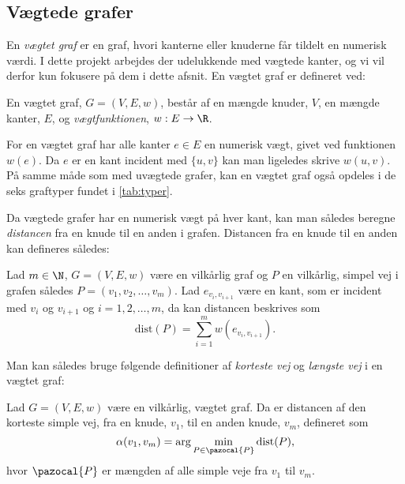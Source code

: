 \subsection{Vægtede grafer} \label{kap:vaegtede}
En \emph{vægtet graf} er en graf, hvori kanterne eller knuderne får tildelt en numerisk værdi. I dette projekt arbejdes der udelukkende med vægtede kanter, og vi vil derfor kun fokusere på dem i dette afsnit.
En vægtet graf er defineret ved:
\begin{defn}
En vægtet graf, $G=(V,E,w)$, består af en mængde knuder, $V$, en mængde kanter, $E$, og \emph{vægtfunktionen}, $w: E \rightarrow \R$.
\end{defn}

For en vægtet graf har alle kanter $e\in E$ en numerisk vægt, givet ved funktionen $w (e)$. Da $e$ er en kant incident med $\{u,v\}$ kan man ligeledes skrive $w (u,v)$. På samme måde som med uvægtede grafer, kan en vægtet graf også opdeles i de seks graftyper fundet i \autoref{tab:typer}.


Da vægtede grafer har en numerisk vægt på hver kant, kan man således beregne \emph{distancen} fra en knude til en anden i grafen. Distancen fra en knude til en anden kan defineres således:

\begin{defn}[Distance]
Lad $m\in \N $, $G=(V,E,w)$ være en vilkårlig graf og $P$ en vilkårlig, simpel vej i grafen således $P=(v_{1},v_{2},\dotsc,v_{m})$. Lad $e_{v_i,v_{i+1}}$ være en kant, som er incident med $v_i$ og $v_{i+1}$ og $i = 1, 2, \dotsc, m$, da kan distancen beskrives som
	\begin{equation}
	\mathrm{dist}(P)=\sum_{i=1}^{m}w(e_{v_i,v_{i+1}}).
	\end{equation}  
\end{defn}

Man kan således bruge følgende definitioner af \emph{korteste vej} og \emph{længste vej} i en vægtet graf:


\begin{defn} \label{defn:min.vej}
Lad $G=(V,E,w)$ være en vilkårlig, vægtet graf. Da er distancen af den korteste simple vej, fra en knude, $v_1$, til en anden knude, $v_m$, defineret som
	\begin{equation}
		\alpha(v_1,v_m)=\arg \min_{P \in \pazocal{P}}
		\textrm{dist}(P),
	\end{equation}
	hvor $\pazocal{P}$ er mængden af alle simple veje fra $v_1$ til $v_m$.
\end{defn}

